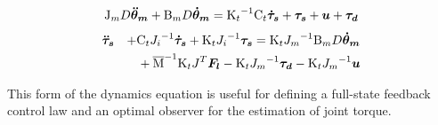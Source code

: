 \documentclass[journal]{IEEEtran}
\newcommand{\vectm}[1]{ { {\text #1} }}
\newcommand{\vects}[1]{{\boldsymbol {#1}}}
\begin{document}
\setlength{\arraycolsep}{0.0em}
\begin{equation}
\vectm{ J_m  D } \vects{ \ddot{\theta}_m} + \vectm{B_m D}\vects{\dot{\theta}_m} = \vectm{K_t}^{-1} \vectm{C_t}\vects{ \dot{\tau}_s} + \vects{\tau_s} + \vects{u} + \vects{\tau_d}
\label{eq:dynamics_eq1}
\end{equation}
\begin{eqnarray}
\label{eq:dynamics_eq2}
\vects{\ddot{\tau}_s} && + \vectm{C_t J_i}^{-1} \vects{\dot{\tau}_s} + \vectm{K_t J_i}^{-1} \vects{\tau_s} = \vectm{K_t   J_m}^{-1}  \vectm{B_m D}\vects{\dot{\theta}_m} \nonumber \\
&&{+}\:\overline{\vectm{M}}^{-1} \vectm{K_t J}^T \vects{F_l} - \vectm{K_t J_{m}}^{-1} \vects{\tau_d} - \vectm{K_t J_m}^{-1} \vects{u}
\end{eqnarray}
\setlength{\arraycolsep}{5pt}

This form of the dynamics equation is useful for defining a full-state feedback control law and an optimal observer for the estimation of joint torque.


\ifCLASSOPTIONcaptionsoff
  \newpage
\fi






%

%
%
\end{document}

